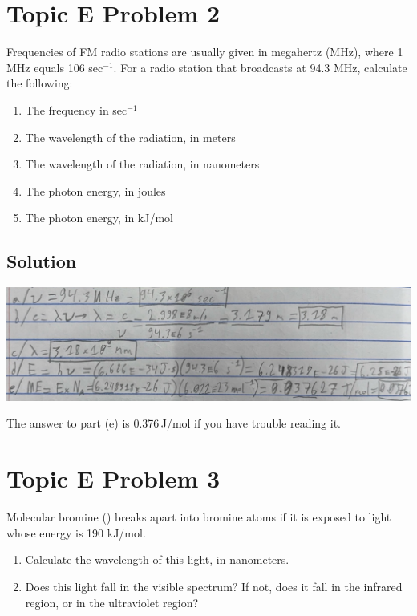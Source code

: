 \documentclass[10pt]{article}
\begin{document}
    \pagebreak
    \section{Topic E Problem 2}
        Frequencies of FM radio stations are usually given in megahertz (MHz), where 1 MHz equals 106 sec$^{-1}$. 
        For a radio station that broadcasts at 94.3 MHz, calculate the following:
        \begin{enumerate}[label=\alph*)]
            \item   The frequency in sec$^{-1}$
            \item   The wavelength of the radiation, in meters
            \item   The wavelength of the radiation, in nanometers
            \item   The photon energy, in joules
            \item   The photon energy, in kJ/mol
        \end{enumerate}
        
        \subsection{Solution}
            \begin{center}
                \includegraphics[width=\textwidth]{Answers Images/E2.jpg}
            \end{center}
            The answer to part (e) is 0.376\,\unit{\joule/\mole} if you have trouble reading it.


    \pagebreak
    \section{Topic E Problem 3}
        Molecular bromine () breaks apart into bromine atoms if it is exposed to light whose energy is 190 kJ/mol.
        \begin{enumerate}[label=\alph*)]
            \item   Calculate the wavelength of this light, in nanometers.
            \item   Does this light fall in the visible spectrum? 
                If not, does it fall in the infrared region, or in the ultraviolet region?
        \end{enumerate}
\end{document}
